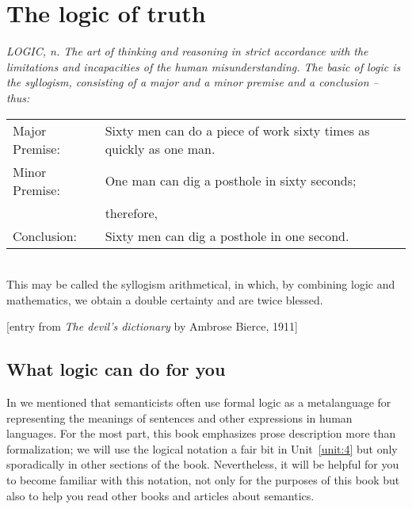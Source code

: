 \chapter{The logic of truth}\label{sec:4}
\begin{flushright} 
\parbox{.7\textwidth}{
\footnotesize\itshape 
 LOGIC, n.  The art of thinking and reasoning in strict accordance with the limitations and incapacities of the human misunderstanding. The basic of logic is the syllogism, consisting of a major and a minor premise and a conclusion – thus:\\

\begin{tabular}{l p{6cm}}
Major Premise: & Sixty men can do a piece of work sixty times as quickly as one man.\\

Minor Premise: & One man can dig a posthole in sixty seconds;\\
& therefore,\\

Conclusion: & Sixty men can dig a posthole in one second.\\
\end{tabular} \\

\noindent
This may be called the syllogism arithmetical, in which, by combining logic and mathematics, we obtain a double certainty and are twice blessed.

{\hfill} \textnormal{[entry from \textit{The devil’s dictionary} by Ambrose Bierce, 1911]}\\ 
}
\end{flushright}


\section{What logic can do for you}\label{sec:4.1}

In  we mentioned that semanticists often use formal logic as a metalanguage for representing the meanings of sentences and other expressions in human languages. For the most part, this book emphasizes prose description more than formalization; we will use the logical notation a fair bit in Unit~\ref{unit:4} but only sporadically in other sections of the book. Nevertheless, it will be helpful for you to become familiar with this notation, not only for the purposes of this book but also to help you read other books and articles about semantics.



